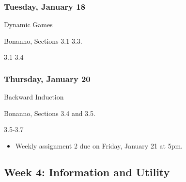 \documentclass[
]{article}
\providecommand{\tightlist}{%
  \setlength{\itemsep}{0pt}\setlength{\parskip}{0pt}}
\begin{document}
\begin{multicols}{2}

\hypertarget{tuesday-january-18}{%
\subsubsection{Tuesday, January 18}\label{tuesday-january-18}}

\begin{description}
\tightlist
\item[Topic]
Dynamic Games
\item[Reading]
Bonanno, Sections 3.1-3.3.
\item[Video lectures]
3.1-3.4
\end{description}

\hypertarget{thursday-january-20}{%
\subsubsection{Thursday, January 20}\label{thursday-january-20}}

\begin{description}
\tightlist
\item[Topic]
Backward Induction
\item[Reading]
Bonanno, Sections 3.4 and 3.5.
\item[Video lectures]
3.5-3.7
\end{description}

\end{multicols}

\begin{itemize}
\tightlist
\item
  Weekly assignment 2 due on Friday, January 21 at 5pm.
\end{itemize}

\hypertarget{week-4-information-and-utility}{%
\subsection{Week 4: Information and
Utility}\label{week-4-information-and-utility}}
\end{document}

